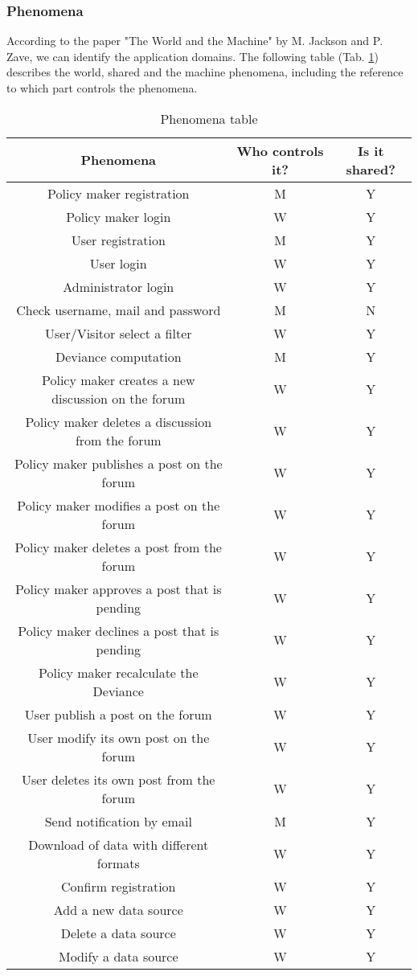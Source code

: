 \subsubsection{Phenomena}
According to the paper "The World and the Machine" by M. Jackson and P. Zave, we can identify the application domains. The following table (Tab. \ref{tab:121.phenomena}) describes the world, shared and the machine phenomena, including the reference to which part controls the phenomena.
\begin{table}[h!]
    \caption{Phenomena table}
    \label{tab:121.phenomena}
    \centering
    \begin{tabular}{c|c|c}
    \rowcolor{gray!50}
     \textbf{Phenomena} & \textbf{Who controls it?} & \textbf{Is it shared?}  \\ \hline\hline
     Policy maker registration & M & Y\\
    Policy maker login & W & Y\\
    User registration &	M &	Y\\
    User login & W & Y\\
    Administrator login & W & Y\\
    Check username, mail and password &	M &	N\\
    User/Visitor select a filter &	W &	Y\\
    Deviance computation & M & Y\\
    Policy maker creates a new discussion on the forum & W & Y\\
    Policy maker deletes a discussion from the forum & W & Y\\
    Policy maker publishes a post on the forum & W & Y\\
    Policy maker modifies a post on the forum &	W &	Y\\
    Policy maker deletes a post from the forum & W & Y\\
    Policy maker approves a post that is pending &	W &	Y\\
    Policy maker declines a post that is pending &	W &	Y\\
    Policy maker recalculate the Deviance &	W &	Y\\
    User publish a post on the forum &	W &	Y\\
    User modify its own post on the forum &	W &	Y\\
    User deletes its own post from the forum & W & Y\\
    Send notification by email & M & Y\\
    Download of data with different formats & W & Y\\
    Confirm registration &	W &	Y\\
    Add a new data source &	W &	Y\\
    Delete a data source &	W &	Y\\
    Modify a data source &	W &	Y\\\hline
    \end{tabular}
    
\end{table}\\
